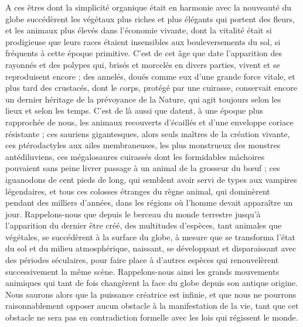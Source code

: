 \documentclass[a4paper, 11pt, oneside, landscape]{article}
\begin{document}
A ces êtres dont la simplicité organique était en harmonie avec la nouveauté du globe succédèrent les végétaux plus riches et plus élégants qui portent des fleurs, et les animaux plus élevés dans l'économie vivante, dont la vitalité était si prodigieuse que leurs races étaient insensibles aux bouleversements du sol, si fréquents à cette époque primitive. C'est de cet âge que date l'apparition des rayonnés et des polypes qui, brisés et morcelés en divers parties, vivent et se reproduisent encore ; des annelés, doués comme eux d'une grande force vitale, et plus tard des crustacés, dont le corps, protégé par une cuirasse, conservait encore un dernier héritage de la prévoyance de la Nature, qui agit toujours selon les lieux et selon les temps. C'est de là aussi que datent, à une époque plus rapprochée de nous, les animaux recouverts d'écaillés et d'une enveloppe coriace résistante ; ces sauriens gigantesques, alors seuls maîtres de la création vivante, ces ptérodactyles aux ailes membraneuses, les plus monstrueux des monstres antédiluviens, ces mégalosaures cuirassés dont les formidables mâchoires pouvaient sans peine livrer passage à un animal de la grosseur du bœuf ; ces iguanodons de cent pieds de long, qui semblent avoir servi de types aux vampires légendaires, et tous ces colosses étranges du règne animal, qui dominèrent pendant des milliers d'années, dans les régions où l'homme devait apparaître un jour. Rappelons-nous que depuis le berceau du monde terrestre jusqu'à l'apparition du dernier être créé, des multitudes d'espèces, tant animales que végétales, se succédèrent à la surface du globe, à mesure que se transforma l'état du sol et du milieu atmosphérique, naissant, se développant et disparaissant avec des périodes séculaires, pour faire place à d'autres espèces qui renouvelèrent successivement la même scène. Rappelons-nous ainsi les grands mouvements animiques qui tant de fois changèrent la face du globe depuis son antique origine. Nous saurons alors que la puissance créatrice est infinie, et que nous ne pourrons raisonnablement opposer aucun obstacle à la manifestation de la vie, tant que cet obstacle ne sera pas en contradiction formelle avec les lois qui régissent le monde.
\end{document}
